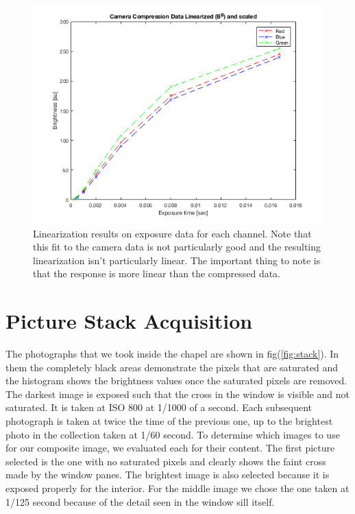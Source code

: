 \documentclass[a4paper]{article}
\begin{document}
\begin{figure}[htb!]
    \begin{center}
        \includegraphics[width=5in]{linearExposure.png}
	 \end{center}
    \caption{Linearization results on exposure data for each channel.  Note that this fit to the camera data is not particularly good and the resulting linearization isn't particularly linear.  The important thing to
    note is that the response is more linear than the compressed data. } 
    \label{fig:linEx}
\end{figure}
\FloatBarrier
\section{Picture Stack Acquisition}
The photographs that we took inside the chapel are shown in fig(\ref{fig:stack}). In them the completely black areas demonstrate the pixels that are saturated and the histogram shows the brightness values once the saturated pixels are removed.  The darkest image is exposed such that the cross in the window is visible and not saturated.  It is taken at ISO 800 at 1/1000 of a second.  Each subsequent photograph is taken at twice the time of the previous one, up to the brightest photo in the collection taken at 1/60 second. To determine which images to use for our composite image, we evaluated each for their content.  The first picture selected is the one with no saturated pixels and clearly shows the faint cross made by the window panes.  The brightest image is also selected because it is exposed properly for the interior.  For the middle image we chose the one taken at 1/125 second because of the detail seen in the window sill itself. 
\end{document}
